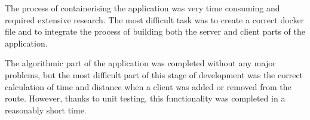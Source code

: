 \documentclass[a4paper,twoside,12pt]{book}
\newcounter{PagesWithoutNumbers}
\begin{document}
The process of containerising the application was very time consuming and required extensive research. The most difficult task was to create a correct docker file and to integrate the process of building both the server and client parts of the application.

The algorithmic part of the application was completed without any major problems, but the most difficult part of this stage of development was the correct calculation of time and distance when a client was added or removed from the route. However, thanks to unit testing, this functionality was completed in a reasonably short time.

 

 


\backmatter
{}
\setcounter{page}{\value{PagesWithoutNumbers}}

\pagestyle{onlyPageNumbers}

%
%

\printbibliography
\end{document}
